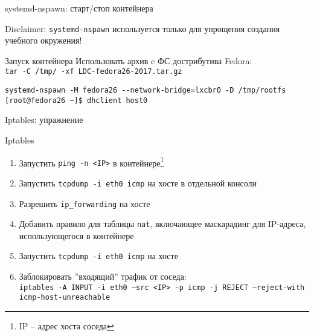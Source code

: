 \begin{frame}[fragile]{systemd-nspawn: старт/стоп контейнера}
    \begin{alert}{Disclaimer}:
        {\tt systemd-nspawn} используется только для упрощения создания учебного окружения!
    \end{alert}
    \begin{block}{Запуск контейнера}
        Использовать архив c ФС дострибутива Fedora:\\
        {\tt tar -C /tmp/ -xf LDC-fedora26-2017.tar.gz}

	\begin{lstlisting}
systemd-nspawn -M fedora26 --network-bridge=lxcbr0 -D /tmp/rootfs
[root@fedora26 ~]$ dhclient host0
\end{lstlisting}
    \end{block}
\end{frame}
\begin{frame}{Iptables: упражнение}
    \begin{block}{Iptables}
        \begin{enumerate}
            \item Запустить {\tt ping -n <IP>} в контейнере\footnote{IP -- адрес хоста соседа}
            \item Запустить {\tt tcpdump -i eth0 icmp} на хосте в отдельной консоли
            \item Разрешить {\tt ip\_forwarding} на хосте
            \item Добавить правило для таблицы {\tt nat},
                включающее маскарадинг для IP-адреса, использующегося в контейнере
            \item Запустить {\tt tcpdump -i eth0 icmp} на хосте
            \item Заблокировать ''входящий'' трафик от соседа:\\
                {\tt iptables -A INPUT -i eth0 --src <IP> -p icmp -j REJECT --reject-with icmp-host-unreachable}
        \end{enumerate}
    \end{block}
\end{frame}
